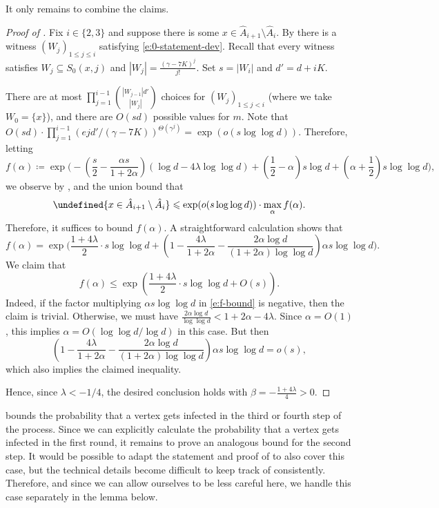 \documentclass[reqno,a4paper,11pt]{amsart}
\theoremstyle{definition}
\renewcommand{\leq}{\leqslant}
\let\Pr\undefined
\begin{document}
It only remains to combine the claims.
\begin{proof}[Proof of ]\label{proof_xinAi+1-Ai}
  Fix $i \in \{2,3\}$ and suppose there is some $x \in \hat{A}_{i+1} \setminus \hat{A}_i$.
  By  there is a witness $(W_j)_{1 \leq j \leq i}$ satisfying \eqref{e:0-statement-dev}.
  Recall that every witness satisfies $W_j \subseteq S_0(x, j)$ and $|W_j|=\frac{(\gamma-7K)^j}{j!}$.
  Set $s = |W_i|$ and $d' = d+iK$.

  There are at most $\prod_{j=1}^{i-1} \binom{|W_{j-1}|d'}{|W_j|}$ choices for $(W_j)_{1 \leq j <i}$ (where we take $W_0 = \{x\}$), and there are $O(sd)$ possible values for $m$.
  Note that $O(sd)\cdot\prod_{j=1}^{i-1} (ejd'/(\gamma-7K))^{\Theta(\gamma^j)} = \exp(o(s \log\log d))$.
  Therefore, letting
  \[
    f(\alpha) \coloneqq \exp\Biggl(-\left(\frac{s}{2} - \frac{\alpha s}{1+2\alpha}\right)\left(\log d - 4\lambda \log \log d\right)+ \left(\frac{1}{2}-\alpha\right)s \log d + \left(\alpha +\frac{1}{2}\right)s \log \log d \Biggr),
  \]
  we observe by ,  and the union bound that
  \[
    \Pr{x \in \hat{A}_{i+1}\setminus \hat{A}_i} \leq \exp(o(s \log\log d)) \cdot \max_\alpha f(\alpha).
  \]
  Therefore, it suffices to bound $f(\alpha)$.
  A straightforward calculation shows that
  \begin{equation}\label{e:f-bound}
    f(\alpha) = \exp\Biggl(\frac{1+4\lambda}{2} \cdot s \log\log d + \left(1 - \frac{4\lambda}{1+2\alpha} - \frac{2 \alpha \log d}{(1+2\alpha)\log \log d} \right) \alpha s \log\log d \Biggr).
  \end{equation}
  We claim that
  \[
    f(\alpha) \leq \exp\left(\frac{1+4\lambda}{2} \cdot s \log\log d + O(s)\right).
  \]
  Indeed, if the factor multiplying $\alpha s \log \log d$ in \eqref{e:f-bound} is negative, then the claim is trivial.
  Otherwise, we must have $\frac{2\alpha \log d}{\log \log d}< 1 + 2\alpha - 4\lambda$.
  Since $\alpha = O(1)$, this implies $\alpha = O(\log\log d / \log d)$ in this case.
  But then
  \[
    \left(1 - \frac{4\lambda}{1+2\alpha} - \frac{2 \alpha \log d}{(1+2\alpha)\log \log d} \right) \alpha s \log\log d = o(s),
  \]
  which also implies the claimed inequality.

  Hence, since $\lambda < -1/4$, the desired conclusion holds with $\beta = -\frac{1+4\lambda}{4} > 0$.
\end{proof}

 bounds the probability that a vertex gets infected in the third or fourth step of the process.
Since we can explicitly calculate the probability that a vertex gets infected in the first round, it remains to prove an analogous bound for the second step.
It would be possible to adapt the statement and proof of  to also cover this case, but the technical details become difficult to keep track of consistently.
Therefore, and since we can allow ourselves to be less careful here, we handle this case separately in the lemma below.
\end{document}
